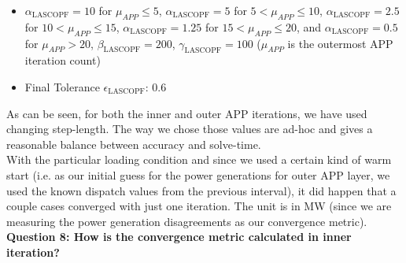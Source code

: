 \documentclass[8pt]{article}
\begin{document}
\begin{itemize}
    \item $\alpha_{\text{LASCOPF}}=10$ for $\mu_{APP}\leq5$, $\alpha_{\text{LASCOPF}}=5$ for $5<\mu_{APP}\leq10$, $\alpha_{\text{LASCOPF}}=2.5$ for $10<\mu_{APP}\leq15$, $\alpha_{\text{LASCOPF}}=1.25$ for $15<\mu_{APP}\leq20$, and $\alpha_{\text{LASCOPF}}=0.5$ for $\mu_{APP}>20$, $\beta_{\text{LASCOPF}}=200$, $\gamma_{\text{LASCOPF}}=100$ ($\mu_{APP}$ is the outermost APP iteration count)
    \item Final Tolerance $\epsilon_{\text{LASCOPF}}$: 0.6
\end{itemize}
As can be seen, for both the inner and outer APP iterations, we have used changing step-length. The way we chose those values are ad-hoc and gives a reasonable balance between accuracy and solve-time.\\

With the particular loading condition and since we used a certain kind of warm start (i.e. as our initial guess for the power generations for outer APP layer, we used the known dispatch values from the previous interval), it did happen that a couple cases converged with just one iteration. The unit is in MW (since we are measuring the power generation disagreements as our convergence metric).\\

\textbf{Question 8: How is the convergence metric calculated in inner iteration?}\\
\end{document}
